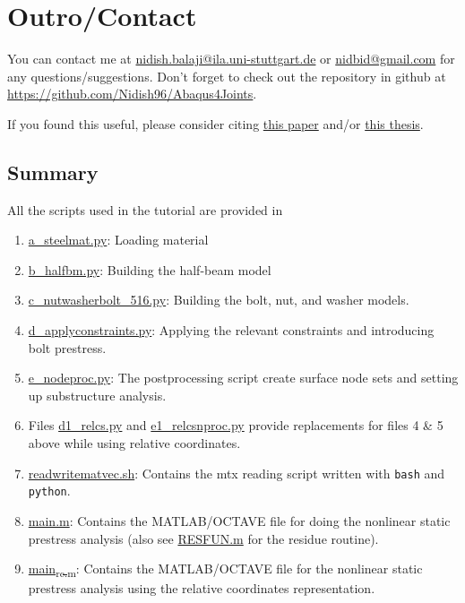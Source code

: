 \documentclass[11pt]{article}
\begin{document}
\section{Outro/Contact}
\label{sec:outro}
You can contact me at \href{mailto:nidish.balaji@ila.uni-stuttgart.de}{nidish.balaji@ila.uni-stuttgart.de} or \href{mailto:nidbid@gmail.com}{nidbid@gmail.com} for any questions/suggestions.
Don't forget to check out the repository in github at \href{https://github.com/Nidish96/Abaqus4Joints}{https://github.com/Nidish96/Abaqus4Joints}.

If you found this useful, please consider citing \href{https://www.sciencedirect.com/science/article/abs/pii/S0888327020300017}{this paper} and/or \href{https://scholarship.rice.edu/handle/1911/113700}{this thesis}.
\subsection{Summary}
\label{sec:org598a21c}
All the scripts used in the tutorial are provided in 
\begin{enumerate}
\item \href{https://github.com/Nidish96/Abaqus4Joints/blob/main/scripts/a\_steelmat.py}{a\_steelmat.py}: Loading material
\item \href{https://github.com/Nidish96/Abaqus4Joints/blob/main/scripts/b\_halfbm.py}{b\_halfbm.py}: Building the half-beam model
\item \href{https://github.com/Nidish96/Abaqus4Joints/blob/main/scripts/c\_nutwasherbolt\_516.py}{c\_nutwasherbolt\_516.py}: Building the bolt, nut, and washer models.
\item \href{https://github.com/Nidish96/Abaqus4Joints/blob/main/scripts/d\_applyconstraints.py}{d\_applyconstraints.py}: Applying the relevant constraints and introducing bolt prestress.
\item \href{https://github.com/Nidish96/Abaqus4Joints/blob/main/scripts/e\_nodeproc.py}{e\_nodeproc.py}: The postprocessing script create surface node sets and setting up substructure analysis.
\item Files \href{https://github.com/Nidish96/Abaqus4Joints/blob/main/scripts/d1\_relcs.py}{d1\_relcs.py} and \href{https://github.com/Nidish96/Abaqus4Joints/blob/main/scripts/e1\_relcsnproc.py}{e1\_relcsnproc.py} provide replacements for files 4 \& 5 above while using relative coordinates.
\item \href{https://github.com/Nidish96/Abaqus4Joints/blob/main/scripts/readwritematvec.sh}{readwritematvec.sh}: Contains the mtx reading script written with \texttt{bash} and \texttt{python}.
\item \href{https://github.com/Nidish96/Abaqus4Joints/blob/main/assets/demo/main.m}{main.m}: Contains the MATLAB/OCTAVE file for doing the nonlinear static prestress analysis (also see \href{https://github.com/Nidish96/Abaqus4Joints/blob/main/assets/demo/RESFUN.m}{RESFUN.m} for the residue routine).
\item \href{https://github.com/Nidish96/Abaqus4Joints/blob/main/assets/demo/main\_rc.m}{main\textsubscript{rc.m}}: Contains the MATLAB/OCTAVE file for the nonlinear static prestress analysis using the relative coordinates representation.
\end{enumerate}
\end{document}
